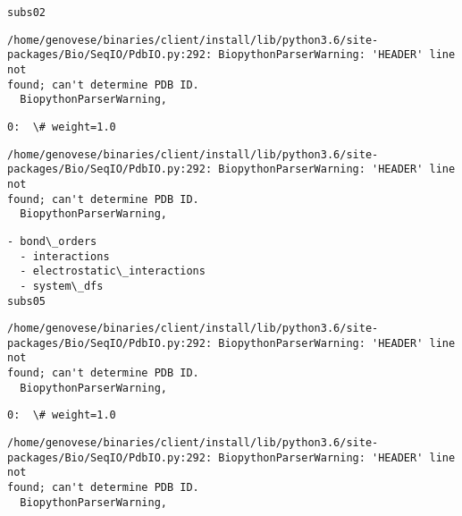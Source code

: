 \documentclass[11pt]{article}
\begin{document}
    \begin{Verbatim}[commandchars=\\\{\}]
subs02
    \end{Verbatim}

    \begin{Verbatim}[commandchars=\\\{\}]
/home/genovese/binaries/client/install/lib/python3.6/site-
packages/Bio/SeqIO/PdbIO.py:292: BiopythonParserWarning: 'HEADER' line not
found; can't determine PDB ID.
  BiopythonParserWarning,
    \end{Verbatim}

    \begin{Verbatim}[commandchars=\\\{\}]
0:  \# weight=1.0
    \end{Verbatim}

    \begin{Verbatim}[commandchars=\\\{\}]
/home/genovese/binaries/client/install/lib/python3.6/site-
packages/Bio/SeqIO/PdbIO.py:292: BiopythonParserWarning: 'HEADER' line not
found; can't determine PDB ID.
  BiopythonParserWarning,
    \end{Verbatim}

    \begin{Verbatim}[commandchars=\\\{\}]
  - bond\_orders
  - interactions
  - electrostatic\_interactions
  - system\_dfs
subs05
    \end{Verbatim}

    \begin{Verbatim}[commandchars=\\\{\}]
/home/genovese/binaries/client/install/lib/python3.6/site-
packages/Bio/SeqIO/PdbIO.py:292: BiopythonParserWarning: 'HEADER' line not
found; can't determine PDB ID.
  BiopythonParserWarning,
    \end{Verbatim}

    \begin{Verbatim}[commandchars=\\\{\}]
0:  \# weight=1.0
    \end{Verbatim}

    \begin{Verbatim}[commandchars=\\\{\}]
/home/genovese/binaries/client/install/lib/python3.6/site-
packages/Bio/SeqIO/PdbIO.py:292: BiopythonParserWarning: 'HEADER' line not
found; can't determine PDB ID.
  BiopythonParserWarning,
    \end{Verbatim}
\end{document}
